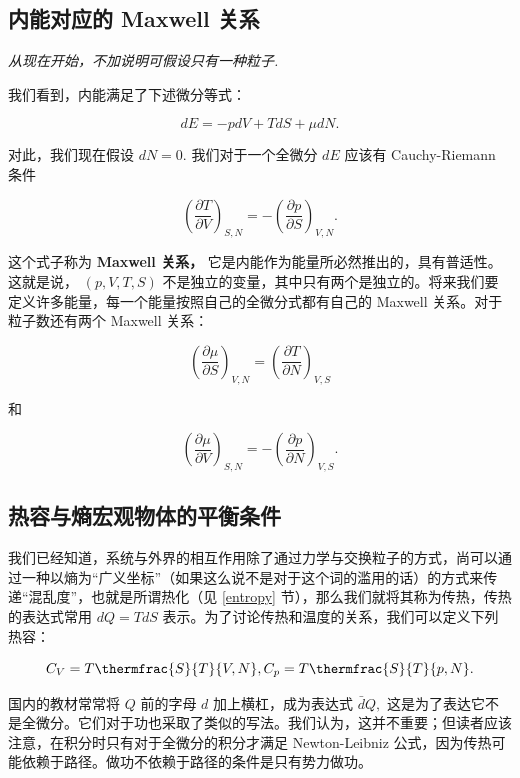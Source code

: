 \subsection{内能对应的 Maxwell 关系}
{\noindent \textit{从现在开始，不加说明可假设只有一种粒子.}}

我们看到，内能满足了下述微分等式：
\begin{linenomath}\begin{equation}
dE = -pdV + TdS + \mu dN.
\end{equation}\end{linenomath}
对此，我们现在假设 $dN = 0.$ 我们对于一个全微分 $dE$ 应该有 Cauchy-Riemann 条件
\begin{linenomath}\begin{equation}
\left( \frac{\partial T}{\partial V} \right)_{S,N} = -\left( \frac{\partial p}{\partial S} \right)_{V,N}.
\end{equation}\end{linenomath}
这个式子称为 \textbf{Maxwell 关系，} 它是内能作为能量所必然推出的，具有普适性。这就是说， $(p,V,T,S)$ 不是独立的变量，其中只有两个是独立的。将来我们要定义许多能量，每一个能量按照自己的全微分式都有自己的 Maxwell 关系。对于粒子数还有两个 Maxwell 关系：
\begin{linenomath}\begin{equation}
\left( \frac{\partial \mu}{\partial S} \right)_{V,N} = \left( \frac{\partial T}{\partial N} \right)_{V,S}
\end{equation}\end{linenomath}
和
\begin{linenomath}\begin{equation}
\left( \frac{\partial \mu}{\partial V} \right)_{S,N} = -\left( \frac{\partial p}{\partial N} \right)_{V,S}.
\end{equation}\end{linenomath}

\subsection{热容与熵\quad 宏观物体的平衡条件}
我们已经知道，系统与外界的相互作用除了通过力学与交换粒子的方式，尚可以通过一种以熵为“广义坐标”（如果这么说不是对于这个词的滥用的话）的方式来传递“混乱度”，也就是所谓热化（见 \ref{entropy} 节），那么我们就将其称为传热，传热的表达式常用 $dQ = TdS$ 表示。为了讨论传热和温度的关系，我们可以定义下列热容：
\begin{linenomath}\begin{equation}
C_V = T \thermfrac{S}{T}{V,N}, C_p = T \thermfrac{S}{T}{p,N}.
\end{equation}\end{linenomath}国内的教材常常将 $Q$ 前的字母 $d$ 加上横杠，成为表达式 $\bar{d}Q,$ 这是为了表达它不是全微分。它们对于功也采取了类似的写法。我们认为，这并不重要；但读者应该注意，在积分时只有对于全微分的积分才满足 Newton-Leibniz 公式，因为传热可能依赖于路径。做功不依赖于路径的条件是只有势力做功。

